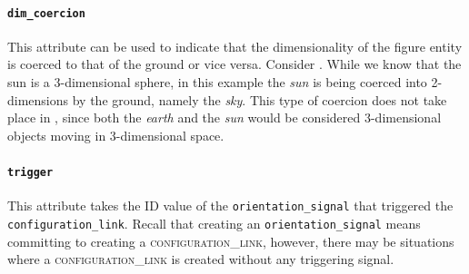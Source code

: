 \documentclass[11pt]{article}
\begin{document}
\fi

\label{ex:ground_requirement}


\paragraph{\texttt{dim\_coercion}} %
\label{par:dim_coercion}

This attribute can be used to indicate that the dimensionality of the figure entity is coerced to that of the ground or vice versa. Consider . While we know that the sun is a 3-dimensional sphere, in this example the \emph{sun} is being coerced into 2-dimensions by the ground, namely the \emph{sky}. This type of coercion does not take place in , since both the \emph{earth} and the \emph{sun} would be considered 3-dimensional objects moving in 3-dimensional space.

\label{ex:coercion}



\paragraph{\texttt{trigger}} %
\label{par:trigger}
This attribute takes the ID value of the \texttt{orientation\_signal} that triggered the \texttt{configuration\_link}. Recall that creating an \texttt{orientation\_signal} means committing to creating a \textsc{configuration\_link}, however, there may be situations where a \textsc{configuration\_link} is created without any triggering signal.

\end{document}
